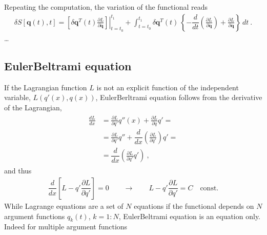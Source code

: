 \documentclass[letterpaper,10pt,english]{jupyterBook}
\begin{document}
\sphinxAtStartPar
Repeating the computation, the variation of the functional reads
\begin{equation*}
\begin{split}\delta S[\mathbf{q}(t), t] = \left.\left[ \delta \mathbf{q}^T(t) \frac{\partial L}{\partial \dot{\mathbf{q}}} \right]\right|_{t=t_0}^{t_1} + \int_{t = t_0}^{t_1} \delta \mathbf{q}^T(t) \, \left\{ - \dfrac{d}{dt} \left( \frac{\partial L}{\partial \dot{\mathbf{q}}} \right) + \frac{\partial L}{\partial \mathbf{q}} \right\} \, dt \ .\end{split}
\end{equation*}
\sphinxAtStartPar
{} …




\subsection{Euler\sphinxhyphen{}Beltrami equation}
\label{\detokenize{ch/calculus-variations/intro:euler-beltrami-equation}}\label{\detokenize{ch/calculus-variations/intro:calculus-variations-euler-beltrami}}
\sphinxAtStartPar
If the Lagrangian function \(L\) is not an explicit function of the independent variable, \(L(q'(x),q(x))\), Euler\sphinxhyphen{}Berltrami equation follows from the derivative of the Lagrangian,
\begin{equation*}
\begin{split}\begin{aligned}
  \frac{d L}{dx} 
  & = \frac{\partial L}{\partial q'} q''(x) + \frac{\partial L}{\partial q} q' = \\
  & = \frac{\partial L}{\partial q'} q'' + \dfrac{d}{dx} \left( \frac{\partial L}{\partial q'} \right) q' = \\
  & = \dfrac{d}{dx} \left( \frac{\partial L}{\partial q'} q' \right) \ ,
\end{aligned}\end{split}
\end{equation*}
\sphinxAtStartPar
and thus
\begin{equation*}
\begin{split}
\dfrac{d}{dx} \left[ L - q' \dfrac{\partial L}{\partial q'} \right] = 0
\qquad \rightarrow \qquad
L - q' \dfrac{\partial L}{\partial q'} = C \quad \text{const.}
\end{split}
\end{equation*}
\sphinxAtStartPar
{} While Lagrange equations are a set of \(N\) equations if the functional depends on \(N\) argument functions \(q_k(t)\), \(k=1:N\), Euler\sphinxhyphen{}Beltrami equation is an equation only. Indeed for multiple argument functions
\end{document}
